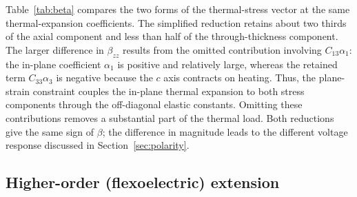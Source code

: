 \documentclass[pdflatex,sn-mathphys-num]{sn-jnl}
\begin{document}
\begin{table}[t]
\centering
\caption{Plane-strain thermal-stress vector: simplified reduction versus the full
three-dimensional contraction, both evaluated at the same thermal-expansion
coefficients
($\alpha_1=+21.8\times10^{-6}\,\text{K}^{-1}$, $\alpha_3=-4.3\times10^{-6}\,\text{K}^{-1}$).}
\label{tab:beta}
\end{table}

Table~\ref{tab:beta} compares the two forms of the thermal-stress vector at the same
thermal-expansion coefficients. The simplified reduction retains about two thirds of
the axial component and less than half of the through-thickness component. The larger
difference in $\beta_{zz}$ results from the omitted contribution involving
$C_{13}\alpha_1$: the in-plane coefficient $\alpha_1$ is positive and relatively large,
whereas the retained term $C_{33}\alpha_3$ is negative because the $c$ axis contracts
on heating. Thus, the plane-strain constraint couples the in-plane thermal expansion
to both stress components through the off-diagonal elastic constants. Omitting these
contributions removes a substantial part of the thermal load. Both reductions give the
same sign of $\beta$; the difference in magnitude leads to the different voltage
response discussed in Section~\ref{sec:polarity}.

\subsection{Higher-order (flexoelectric) extension}
\label{sec:flexo}
\end{document}
